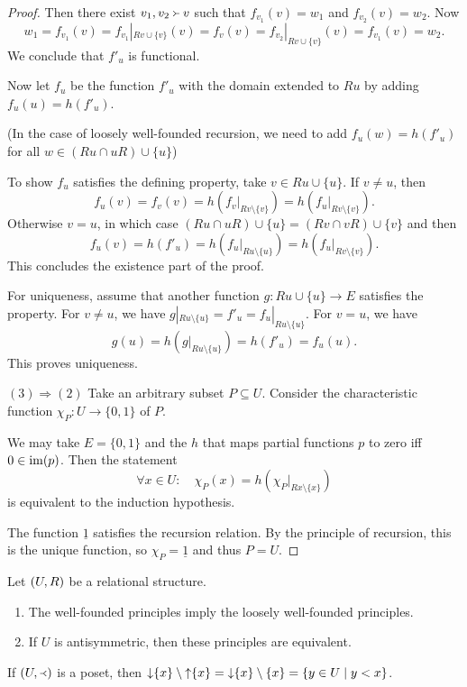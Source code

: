 \begin{proof}
Then there exist $v_1, v_2 \Yright v$ such that $f_{v_1}(v) = w_1$ and $f_{v_2}(v) = w_2$. Now
\[ w_1 = f_{v_1}(v) = f_{v_1}|_{Rv\cup \{v\}}(v) = f_v(v) = f_{v_2}|_{Rv\cup\{v\}}(v) = f_{v_1}(v) = w_2. \]
We conclude that $f'_u$ is functional.

Now let $f_u$ be the function $f'_u$ with the domain extended to $Ru$ by adding $f_u(u) = h(f'_u)$.

(In the case of loosely well-founded recursion, we need to add $f_u(w) = h(f'_u)$ for all $w\in (Ru\cap uR)\cup\{u\}$)

To show $f_u$ satisfies the defining property, take $v\in Ru\cup\{u\}$. If $v\neq u$, then
\[ f_u(v) = f_v(v) = h(f_v|_{Rv\setminus\{v\}}) = h(f_u|_{Rv\setminus\{v\}}). \]
Otherwise $v=u$, in which case $(Ru\cap uR)\cup\{u\} = (Rv\cap vR)\cup\{v\}$ and then
\[ f_u(v) = h(f'_u) = h(f_u|_{Ru\setminus\{u\}}) = h(f_u|_{Rv\setminus\{v\}}). \]
This concludes the existence part of the proof.

For uniqueness, assume that another function $g: Ru\cup \{u\}\to E$ satisfies the property. For $v\neq u$, we have $g|_{Ru\setminus\{u\}} = f'_u = f_u|_{Ru\setminus\{u\}}$. For $v=u$, we have
\[ g(u) = h(g|_{Ru\setminus\{u\}}) = h(f'_u) = f_u(u). \]
This proves uniqueness.

$\boxed{(3) \Rightarrow (2)}$ Take an arbitrary subset $P\subseteq U$. Consider the characteristic function $\chi_P: U\to \{0,1\}$ of $P$.

We may take $E = \{0,1\}$ and the $h$ that maps partial functions $p$ to zero iff $0\in\operatorname{im}(p)$. Then the statement
\[ \forall x\in U: \quad\chi_P(x) = h(\chi_P|_{Rx\setminus\{x\}}) \]
is equivalent to the induction hypothesis.

The function $\underline{1}$ satisfies the recursion relation. By the principle of recursion, this is the unique function, so $\chi_P = \underline{1}$ and thus $P = U$.
\end{proof}
\begin{corollary}
Let $\sSet{U,R}$ be a relational structure.
\begin{enumerate}
\item The well-founded principles imply the loosely well-founded principles.
\item If $U$ is antisymmetric, then these principles are equivalent.
\end{enumerate}
\end{corollary}
If $\sSet{U,\Yleft}$ is a poset, then $\downset\{x\}\setminus\upset\{x\} = \downset\{x\}\setminus\{x\} = \setbuilder{y\in U}{y<x}$.

